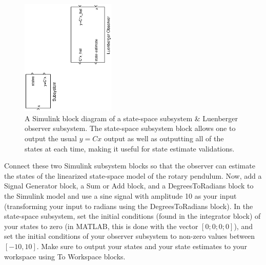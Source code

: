 \begin{figure}[htb!]
    \centering
    \includegraphics[width=0.4\textwidth,angle=-90]{eps/lab_3/luenberger_openloop_student}
    \caption{A Simulink block diagram of a state-space subsystem \& Luenberger observer subsystem. The state-space subsystem block allows one to output the usual $y=Cx$ output as well as outputting all of the states at each time, making it useful for state estimate validations.}
    \label{figure:lab3_statespace_block}
\end{figure}

Connect these two Simulink subsystem blocks so that the observer can estimate the states of the linearized state-space model of the rotary pendulum. Now, add a Signal Generator block, a Sum or Add block, and a DegreesToRadians block to the Simulink model and use a sine signal with amplitude 10 as your input (transforming your input to radians using the DegreesToRadians block). In the state-space subsystem, set the initial conditions (found in the integrator block) of your states to zero (in MATLAB, this is done with the vector $[0;0;0;0]$), and set the initial conditions of your observer subsystem to non-zero values between $[-10,10]$. Make sure to output your states and your state estimates to your workspace using To Workspace blocks.

